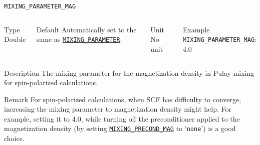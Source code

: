 \begin{frame}[allowframebreaks]{\texttt{MIXING\_PARAMETER\_MAG}} \label{MIXING_PARAMETER_MAG}
\vspace*{-12pt}
\begin{columns}
\begin{block}{Type}
Double
\end{block}

\begin{block}{Default}
Automatically set to the same as \hyperlink{MIXING_PARAMETER}{\texttt{MIXING\_PARAMETER}}.
\end{block}

\begin{block}{Unit}
No unit
\end{block}

\begin{block}{Example}
\texttt{MIXING\_PARAMETER\_MAG}: 4.0
\end{block}
\end{columns}

\begin{block}{Description}
The mixing parameter for the magnetization density in Pulay mixing for spin-polarized calculations.
\end{block}

\begin{block}{Remark}
    For spin-polarized calculations, when SCF has difficulty to converge, increasing the mixing parameter to magnetization density might help. For example, setting it to 4.0, while turning off the preconditioner applied to the magnetization density (by setting \hyperlink{MIXING_PRECOND_MAG}{\texttt{MIXING\_PRECOND\_MAG}} to `\texttt{none}') is a good choice.
\end{block}

\end{frame}


